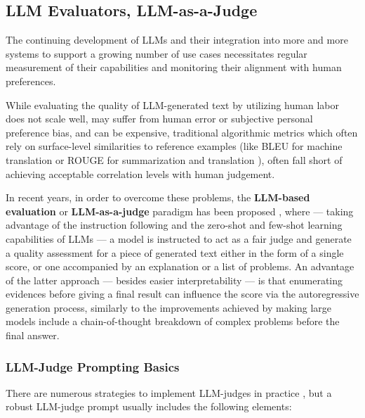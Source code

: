 \documentclass[noindent,nohyp,parspace,titlepage,twoside,12pt]{article}
\begin{document}
    \subsection{LLM Evaluators, LLM-as-a-Judge}

      The continuing development of LLMs and their integration into more and
      more systems to support a growing number of use cases necessitates regular
      measurement of their capabilities and monitoring their alignment with
      human preferences.

      While evaluating the quality of LLM-generated text by utilizing human
      labor does not scale well, may suffer from human error or subjective
      personal preference bias, and can be expensive, traditional algorithmic
      metrics which often rely on surface-level similarities to reference
      examples (like BLEU for machine translation \cite{bleu} or ROUGE for
      summarization and translation \cite{rouge}), often fall short of achieving
      acceptable correlation levels with human judgement.

      In recent years, in order to overcome these problems, the
      \textbf{LLM-based evaluation} or \textbf{LLM-as-a-judge} paradigm has
      been proposed \cite{gptscore,chatgptgoodeval,reffree,geval},
      where --- taking advantage of the instruction following and the zero-shot
      and few-shot learning capabilities of LLMs --- a model is instructed to
      act as a fair judge and generate a quality assessment for a piece of
      generated text either in the form of a single score, or one accompanied by
      an explanation or a list of problems. An advantage of the latter approach
      --- besides easier interpretability --- is that enumerating evidences
      before giving a final result can influence the score via the
      autoregressive generation process, similarly to the improvements achieved
      by making large models include a chain-of-thought \cite{cot} breakdown of
      complex problems before the final answer.

      \subsubsection{LLM-Judge Prompting Basics}

        There are numerous strategies to implement LLM-judges in practice
        \cite{judgetaxonomy}, but a robust LLM-judge prompt usually includes
        the following elements:
\end{document}
